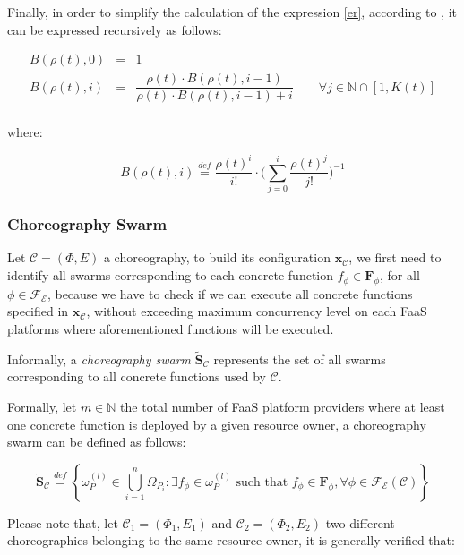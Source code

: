 \documentclass[12pt,a4paper]{report}
\newcommand{\mathDef}{\overset{\textit{def}}{=}}
\newcommand{\N}{\mathbb{N}}
\newcommand{\SetFromOneTo}[1]{\N \cap \left[1,#1\right]}
\begin{document}
Finally, in order to simplify the calculation of the expression \ref{er}, according to \cite{ERLANG}, it can be expressed recursively as follows:

\begin{eqnarray}
	B(\rho(t),0) & = & 1 \\
	B(\rho(t),i) & = & \dfrac{\rho(t) \cdot B(\rho(t),i - 1)}{\rho(t) \cdot B(\rho(t),i - 1) + i} \qquad \forall j \in \SetFromOneTo{K(t)} \\
\end{eqnarray}

where:

\begin{equation}
	B(\rho(t),i) \mathDef \dfrac{\rho(t)^{i}}{i!} \cdot \Bigg( \displaystyle\sum_{j=0}^{i} \dfrac{\rho(t)^j}{j!}\Bigg)^{-1}
\end{equation}

\subsubsection{Choreography Swarm}

Let $\mathcal{C} = (\Phi,E)$ a choreography, to build its configuration $\textbf{x}_{\mathcal{C}}$, we first need to identify all swarms corresponding to each concrete function $f_{\phi} \in \textbf{F}_{\phi}$, for all $\phi \in \mathscr{F_E}$, because we have to check if we can execute all concrete functions specified in $\textbf{x}_{\mathcal{C}}$, without exceeding maximum concurrency level on each FaaS platforms where aforementioned functions will be executed.

Informally, a \textit{choreography swarm} $\widetilde{\textbf{S}}_{\mathcal{C}}$ represents the set of all swarms corresponding to all concrete functions used by $\mathcal{C}$. 

Formally, let $m \in \N$ the total number of FaaS platform providers where at least one concrete function is deployed by a given resource owner, a choreography swarm can be defined as follows:

\begin{equation}
	\widetilde{\textbf{S}}_{\mathcal{C}} \mathDef \left\{ \omega_{P}^{(l)} \in \bigcup_{i=1}^n \Omega_{P_i} : \exists f_{\phi} \in \omega_{P}^{(l)} \text{ such that } f_{\phi} \in \textbf{F}_{\phi}, \forall \phi \in \mathscr{F_E}(\mathcal{C}) \right\}
\end{equation}

Please note that, let $\mathcal{C}_1 = (\Phi_1,E_1)$ and $\mathcal{C}_2 = (\Phi_2,E_2)$ two different choreographies belonging to the same resource owner, it is generally verified that:
\end{document}

